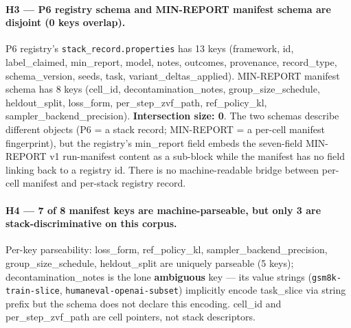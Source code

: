 \paragraph{H3 --- P6 registry schema and MIN-REPORT manifest schema
are disjoint (0 keys overlap).}
P6 registry's \texttt{stack\_record.properties} has 13 keys
(\textsf{framework, id, label\_claimed, min\_report, model, notes,
outcomes, provenance, record\_type, schema\_version, seeds, task,
variant\_deltas\_applied}). MIN-REPORT manifest schema has 8 keys
(\textsf{cell\_id, decontamination\_notes, group\_size\_schedule,
heldout\_split, loss\_form, per\_step\_zvf\_path, ref\_policy\_kl,
sampler\_backend\_precision}). \textbf{Intersection size: 0}. The
two schemas describe different objects (P6 = a stack record;
MIN-REPORT = a per-cell manifest fingerprint), but the registry's
\textsf{min\_report} field embeds the seven-field MIN-REPORT v1 run-manifest content as
a sub-block while the manifest has no field linking back to a
registry \textsf{id}. There is no machine-readable bridge between
per-cell manifest and per-stack registry record.

\paragraph{H4 --- 7 of 8 manifest keys are machine-parseable, but
only 3 are stack-discriminative on this corpus.}
Per-key parseability: \textsf{loss\_form, ref\_policy\_kl,
sampler\_backend\_precision, group\_size\_schedule, heldout\_split}
are uniquely parseable (5 keys); \textsf{decontamination\_notes} is
the lone \textbf{ambiguous} key --- its value strings
(\texttt{gsm8k-train-slice}, \texttt{humaneval-openai-subset})
implicitly encode \textsf{task\_slice} via string prefix but the
schema does not declare this encoding. \textsf{cell\_id} and
\textsf{per\_step\_zvf\_path} are cell pointers, not stack
descriptors.

